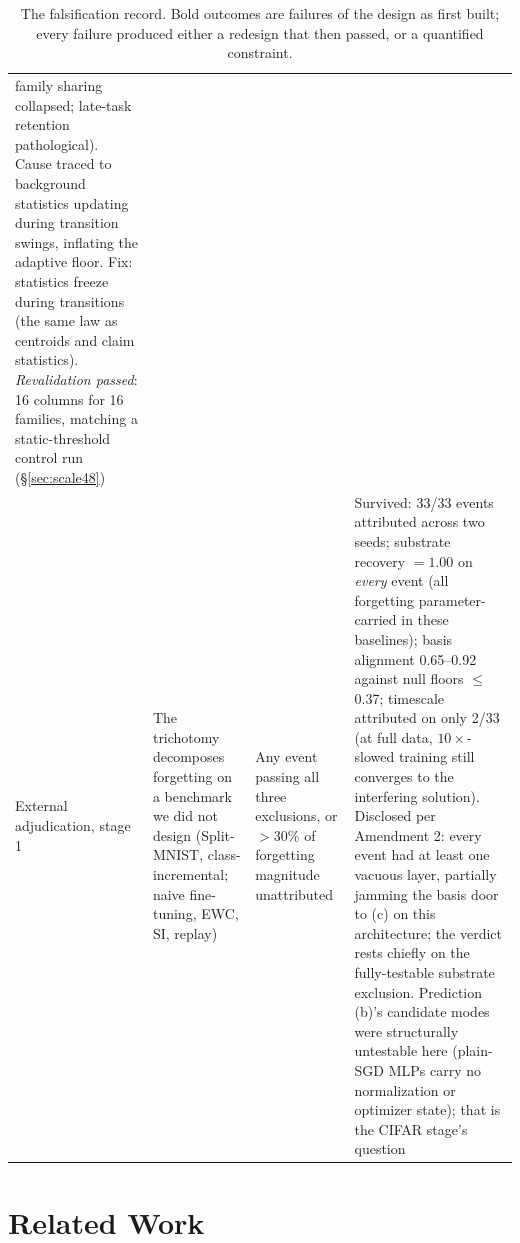 \documentclass[11pt]{article}
\begin{document}
\begin{table}[ht]
\begin{tabular}{p{2.9cm} p{4.4cm} p{3.2cm} p{3.8cm}}
family sharing collapsed; late-task retention pathological). Cause traced
to background statistics updating during transition swings, inflating the
adaptive floor. Fix: statistics freeze during transitions (the same law as
centroids and claim statistics). \emph{Revalidation passed}: 16 columns for
16 families, matching a static-threshold control run
(\S\ref{sec:scale48})\\
\addlinespace
External adjudication, stage 1 & The trichotomy decomposes forgetting on a
benchmark we did not design (Split-MNIST, class-incremental; naive
fine-tuning, EWC, SI, replay) & Any event passing all three exclusions, or
$>$30\% of forgetting magnitude unattributed & Survived: 33/33 events
attributed across two seeds; substrate recovery $=1.00$ on \emph{every}
event (all forgetting parameter-carried in these baselines); basis
alignment 0.65--0.92 against null floors $\le$0.37; timescale attributed
on only 2/33 (at full data, $10\times$-slowed training still converges to
the interfering solution). Disclosed per Amendment 2: every event had at
least one vacuous layer, partially jamming the basis door to (c) on this
architecture; the verdict rests chiefly on the fully-testable substrate
exclusion. Prediction (b)'s candidate modes were structurally untestable
here (plain-SGD MLPs carry no normalization or optimizer state); that is
the CIFAR stage's question\\
\bottomrule
\end{tabular}
\caption{The falsification record. Bold outcomes are failures of the
design as first built; every failure produced either a redesign that then
passed, or a quantified constraint.}
\label{tab:falsification}
\end{table}

\section{Related Work}
\end{document}
